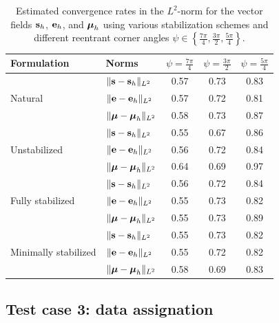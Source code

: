 \begin{table}[h!]
	\centering
	\caption{Estimated convergence rates in the $ L^2 $-norm for the vector fields $ \mathbf{s}_h $, $ \mathbf{e}_h $, and $ \boldsymbol{\mu}_h $ using various stabilization schemes and different reentrant corner angles $ \psi \in \left\{ \frac{7\pi}{4}, \frac{3\pi}{2}, \frac{5\pi}{4} \right\} $.}
	\begin{tabular}{l l c c c}
		\toprule
		Formulation & Norms & $\psi = \frac{7\pi}{4}$ & $\psi = \frac{3\pi}{2}$ & $\psi = \frac{5\pi}{4}$ \\ [2pt]
		\hline
		\multirow{3}{*}{Natural}    & $\|\mathbf{s}-\mathbf{s}_{h}\|_{L^{2}}$ & 0.57 & 0.73 & 0.83  \\
		                                 & $\|\mathbf{e}-\mathbf{e}_{h}\|_{L^{2}}$ & 0.57 & 0.72 & 0.81 \\
		                                 & $\|\boldsymbol{\mu}-\boldsymbol{\mu}_{h}\|_{L^{2}}$ & 0.58 & 0.73 & 0.87 \\
		\hline
		\multirow{3}{*}{Unstabilized}    & $\|\mathbf{s}-\mathbf{s}_{h}\|_{L^{2}}$ & 0.55 & 0.67 & 0.86 \\
		                                 & $\|\mathbf{e}-\mathbf{e}_{h}\|_{L^{2}}$ & 0.56 & 0.72 & 0.84 \\
		                                 & $\|\boldsymbol{\mu}-\boldsymbol{\mu}_{h}\|_{L^{2}}$ & 0.64 & 0.69 & 0.97 \\
		\hline
		\multirow{3}{*}{Fully stabilized} & $\|\mathbf{s}-\mathbf{s}_{h}\|_{L^{2}}$ & 0.56 & 0.72 & 0.84 \\
		                                 & $\|\mathbf{e}-\mathbf{e}_{h}\|_{L^{2}}$ & 0.55 & 0.73 & 0.82 \\
		                                 & $\|\boldsymbol{\mu}-\boldsymbol{\mu}_{h}\|_{L^{2}}$ & 0.55 & 0.73 & 0.89 \\
		\hline
		\multirow{3}{*}{Minimally stabilized} & $\|\mathbf{s}-\mathbf{s}_{h}\|_{L^{2}}$ & 0.55 & 0.73 & 0.82 \\
		                                     & $\|\mathbf{e}-\mathbf{e}_{h}\|_{L^{2}}$ & 0.55 & 0.72 & 0.82 \\
		                                     & $\|\boldsymbol{\mu}-\boldsymbol{\mu}_{h}\|_{L^{2}}$ & 0.58 & 0.69 & 0.83 \\
		\bottomrule
	\end{tabular}
	\label{tab:vector_errors}
\end{table}


\newpage
\subsection{Test case 3: data assignation}

